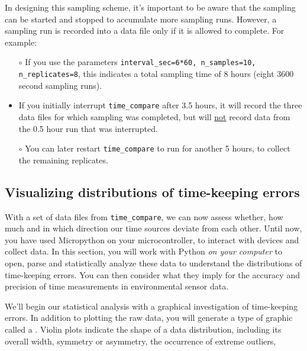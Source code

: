 \begin{enumerate}
	\smallskip
	In designing this sampling scheme, it's important to be aware that the sampling can be started and stopped to accumulate more sampling runs.
	However, a sampling run is recorded into a data file only if it is allowed to complete.	For example:
\begin{itemize}
	\item[$\circ$] If you use the parameters \lstinline{interval_sec=6*60, n_samples=10, n_replicates=8}, this indicates a total sampling time of 8 hours (eight 3600 second sampling runs).
	
	\item[$\circ$] If you initially interrupt \lstinline{time_compare} after 3.5 hours, it will record the three data files for which sampling was completed, but will \underline{not} record data from the 0.5 hour run that was interrupted.
	
	\item[$\circ$] You can later restart \lstinline{time_compare} to run for another 5 hours, to collect the remaining replicates.
\end{itemize}		
\end{enumerate}


\subsection{Visualizing distributions of time-keeping errors}

With a set of data files from \lstinline{time_compare}, we can now assess whether, how much and in which direction our time sources deviate from each other. 
Until now, you have used Micropython on your microcontroller, to interact with devices and collect data.
In this section, you will work with Python \emph{on your computer} to open, parse and statistically analyze these data to understand the distributions of time-keeping errors.
You can then consider what they imply for the accuracy and precision of time measurements in environmental sensor data.  

We'll begin our statistical analysis with a graphical investigation of time-keeping errors. 
In addition to plotting the raw data, you will generate a type of graphic called a .
Violin plots indicate the shape of a data distribution, including its overall width, symmetry or asymmetry, the occurrence of extreme outliers, \etc

